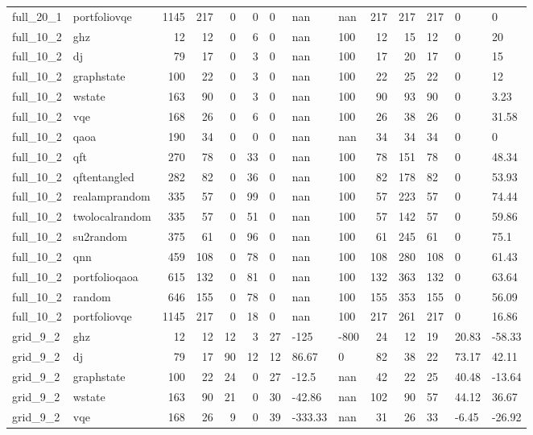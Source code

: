 \begin{longtable}{llrrrrlllrrlll}
full\_20\_1 & portfoliovqe & 1145 & 217 & 0 & 0 & 0 & nan & nan & 217 & 217 & 217 & 0 & 0 \\
full\_10\_2 & ghz & 12 & 12 & 0 & 6 & 0 & nan & 100 & 12 & 15 & 12 & 0 & 20 \\
full\_10\_2 & dj & 79 & 17 & 0 & 3 & 0 & nan & 100 & 17 & 20 & 17 & 0 & 15 \\
full\_10\_2 & graphstate & 100 & 22 & 0 & 3 & 0 & nan & 100 & 22 & 25 & 22 & 0 & 12 \\
full\_10\_2 & wstate & 163 & 90 & 0 & 3 & 0 & nan & 100 & 90 & 93 & 90 & 0 & 3.23 \\
full\_10\_2 & vqe & 168 & 26 & 0 & 6 & 0 & nan & 100 & 26 & 38 & 26 & 0 & 31.58 \\
full\_10\_2 & qaoa & 190 & 34 & 0 & 0 & 0 & nan & nan & 34 & 34 & 34 & 0 & 0 \\
full\_10\_2 & qft & 270 & 78 & 0 & 33 & 0 & nan & 100 & 78 & 151 & 78 & 0 & 48.34 \\
full\_10\_2 & qftentangled & 282 & 82 & 0 & 36 & 0 & nan & 100 & 82 & 178 & 82 & 0 & 53.93 \\
full\_10\_2 & realamprandom & 335 & 57 & 0 & 99 & 0 & nan & 100 & 57 & 223 & 57 & 0 & 74.44 \\
full\_10\_2 & twolocalrandom & 335 & 57 & 0 & 51 & 0 & nan & 100 & 57 & 142 & 57 & 0 & 59.86 \\
full\_10\_2 & su2random & 375 & 61 & 0 & 96 & 0 & nan & 100 & 61 & 245 & 61 & 0 & 75.1 \\
full\_10\_2 & qnn & 459 & 108 & 0 & 78 & 0 & nan & 100 & 108 & 280 & 108 & 0 & 61.43 \\
full\_10\_2 & portfolioqaoa & 615 & 132 & 0 & 81 & 0 & nan & 100 & 132 & 363 & 132 & 0 & 63.64 \\
full\_10\_2 & random & 646 & 155 & 0 & 78 & 0 & nan & 100 & 155 & 353 & 155 & 0 & 56.09 \\
full\_10\_2 & portfoliovqe & 1145 & 217 & 0 & 18 & 0 & nan & 100 & 217 & 261 & 217 & 0 & 16.86 \\
grid\_9\_2 & ghz & 12 & 12 & 12 & 3 & 27 & -125 & -800 & 24 & 12 & 19 & 20.83 & -58.33 \\
grid\_9\_2 & dj & 79 & 17 & 90 & 12 & 12 & 86.67 & 0 & 82 & 38 & 22 & 73.17 & 42.11 \\
grid\_9\_2 & graphstate & 100 & 22 & 24 & 0 & 27 & -12.5 & nan & 42 & 22 & 25 & 40.48 & -13.64 \\
grid\_9\_2 & wstate & 163 & 90 & 21 & 0 & 30 & -42.86 & nan & 102 & 90 & 57 & 44.12 & 36.67 \\
grid\_9\_2 & vqe & 168 & 26 & 9 & 0 & 39 & -333.33 & nan & 31 & 26 & 33 & -6.45 & -26.92 \\

\end{longtable}
